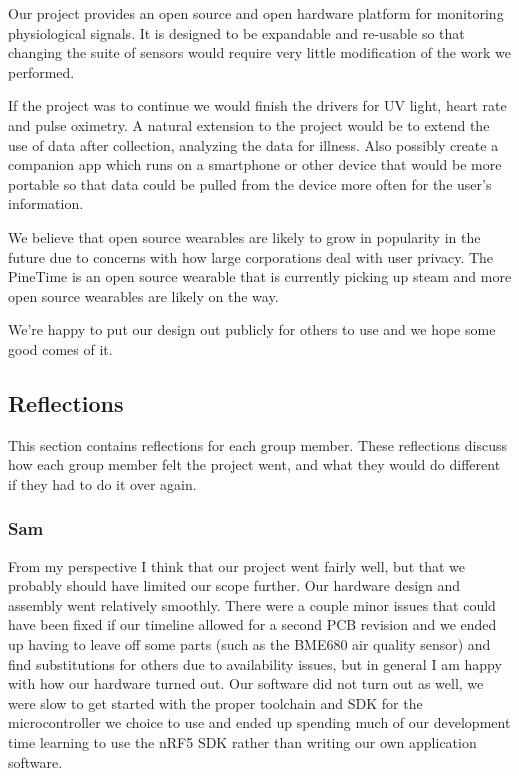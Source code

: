 Our project provides an open source and open hardware platform for monitoring physiological signals.
It is designed to be expandable and re-usable so that changing the suite of sensors would require
very little modification of the work we performed.

If the project was to continue we would finish the drivers for UV light, heart rate and pulse oximetry.
A natural extension to the project would be to extend the use of data after collection, 
analyzing the data for illness.
Also possibly create a companion app which runs on a smartphone or other device
that would be more portable so that data could be pulled from the device more often
for the user's information.

We believe that open source wearables are likely to grow in popularity in the future due to
concerns with how large corporations deal with user privacy. The PineTime is an
open source wearable that is currently picking
up steam and more open source wearables are likely on the way.

We're happy to put our design out publicly for others to use and we hope some
good comes of it.

\subsection{Reflections}

This section contains reflections for each group member. These reflections
discuss how each group member felt the project went, and what they would do
different if they had to do it over again.

\subsubsection{Sam}

From my perspective I think that our project went fairly well, but that we
probably should have limited our scope further. Our hardware design and assembly
went relatively smoothly. There were a couple minor issues that could have been
fixed if our timeline allowed for a second PCB revision and we ended up having
to leave off some parts (such as the BME680 air quality sensor) and find
substitutions for others due to availability issues, but in general I am happy
with how our hardware turned out. Our software did not turn out as well, we
were slow to get started with the proper toolchain and SDK for the
microcontroller we choice to use and ended up spending much of our development
time learning to use the nRF5 SDK rather than writing our own application
software.


